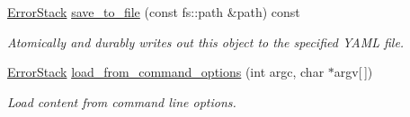 \begin{DoxyCompactItemize}
\hyperlink{classalps_1_1ErrorStack}{Error\+Stack} \hyperlink{structalps_1_1Externalizable_a307766812750ba20517950d0caf554ae}{save\+\_\+to\+\_\+file} (const fs\+::path \&path) const 
\begin{DoxyCompactList}\small\item\em Atomically and durably writes out this object to the specified Y\+A\+ML file. \end{DoxyCompactList}\item 
\hyperlink{classalps_1_1ErrorStack}{Error\+Stack} \hyperlink{structalps_1_1Externalizable_abf8a8a68cc0fc81aa8fec5b7d4092253}{load\+\_\+from\+\_\+command\+\_\+options} (int argc, char $\ast$argv\mbox{[}$\,$\mbox{]})
\begin{DoxyCompactList}\small\item\em Load content from command line options. \end{DoxyCompactList}\end{DoxyCompactItemize}
